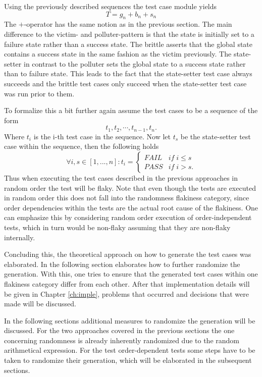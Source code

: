 \documentclass[
fancyheadings, %
%
%
]{stsreprt}
\begin{document}
Using the previously described sequences the test case module yields 
\[
    T = g_n + b_n + s_n 
\]
The $+$-operator has the same notion as in the previous section. The main difference to the victim- and polluter-pattern is that the state is initially set to a failure state rather than a success state. The brittle asserts that the global state contains a success state in the same fashion as the victim previously. The state-setter in contrast to the polluter sets the global state to a success state rather than to failure state. This leads to the fact that the state-setter test case always succeeds and the brittle test cases only succeed when the state-setter test case was run prior to them. \par
To formalize this a bit further again assume the test cases to be a sequence of the form
\[
    t_1, t_2, \cdots, t_{n-1}, t_n.
\]
Where $t_i$ is the i-th test case in the sequence. Now let $t_s$ be the state-setter test case within the sequence, then the following holds
\begin{equation*}
\forall i,s \in [1, ..., n]:
t_i=
    \begin{cases}
        FAIL  & if \; i \leq s  \\ 
        PASS  & if \; i > s.
    \end{cases}
\end{equation*}
Thus when executing the test cases described in the previous approaches in random order the test will be flaky. 
Note that even though the tests are executed in random order this does not fall into the randomness flakiness category, since order dependencies within the tests are the actual root cause of the flakiness. 
One can emphasize this by considering random order execution of order-independent tests, which in turn would be non-flaky assuming that they are non-flaky internally. \par
Concluding this, the theoretical approach on how to generate the test cases was elaborated. 
In the following section elaborates how to further randomize the generation. 
With this, one tries to ensure that the generated test cases within one flakiness category differ from each other. 
After that implementation details will be given in Chapter \ref{ch:imple}, problems that occurred and decisions that were made will be discussed. \par

In the following sections additional measures to randomize the generation will be discussed. 
For the two approaches covered in the previous sections the one concerning randomness is already inherently randomized due to the random arithmetical expression. 
For the test order-dependent tests some steps have to be taken to randomize their generation, which will be elaborated in the subsequent sections. 
\end{document}
